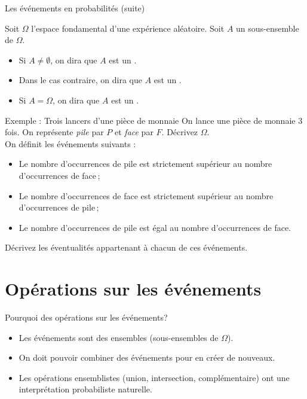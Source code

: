 \documentclass[nuit,charter,pied,handout]{BeamerJS}
\begin{document}
\begin{frame}[t]{Les événements en probabilités (suite)}
\begin{defns}
	Soit $\Omega$ l'espace fondamental d'une expérience aléatoire. Soit $A$ un sous-ensemble de $\Omega$. 
	\begin{itemize}
	\item Si $A\neq\emptyset$, on dira que $A$ est un . 
	\item Dans le cas contraire, on dira que $A$ est un . 
	\item Si $A=\Omega$, on dira que $A$ est un .
	\end{itemize}
\end{defns}
\end{frame}

\begin{frame}{Exemple : Trois lancers d'une pièce de monnaie}
	On lance une pièce de monnaie \num{3} fois. On représente \textit{pile} par $P$ et \textit{face} par $F$. Décrivez $\Omega$.\\[0.3cm] \pause 
	On définit les événements suivants : \pause 
	\begin{itemize}
		\item[{\color{black}\(A=\)}] Le nombre d'occurrences de pile est strictement supérieur au nombre d'occurrences de face\,; 
		\item[{\color{black}\(B=\)}] Le nombre d'occurrences de face est strictement supérieur au nombre d'occurrences de pile\,; 
		\item[{\color{black}\(C=\)}] Le nombre d'occurrences de pile est égal au nombre d'occurrences de face.
	\end{itemize}
	\pause
	Décrivez les éventualités appartenant à chacun de ces événements.
\end{frame}

\section{Opérations sur les événements}

\begin{frame}[c]{Pourquoi des opérations sur les événements?}
\pause
\begin{itemize}
	\item Les événements sont des ensembles (sous-ensembles de \(\Omega\)).\pause
	\item On doit pouvoir combiner des événements pour en créer de nouveaux.\pause
	\item Les opérations ensemblistes (union, intersection, complémentaire) ont une interprétation probabiliste naturelle.
\end{itemize}
\end{frame}
\end{document}
